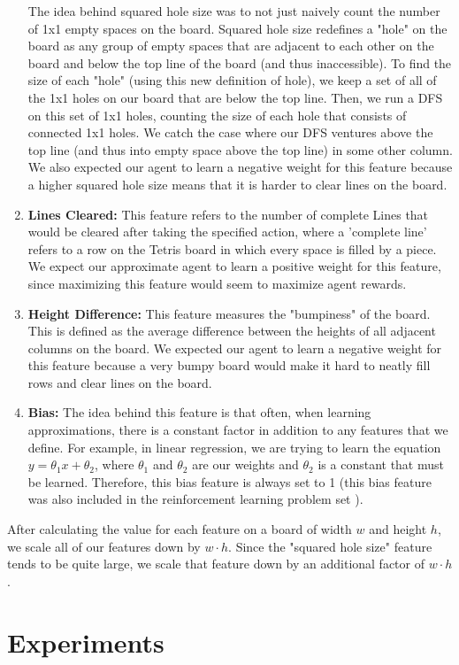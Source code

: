 \documentclass[11pt]{article}
\begin{document}
\begin{enumerate}
    The idea behind squared hole size was to not just naively count the number of 1x1 empty spaces on the board. Squared hole size redefines a "hole" on the board as any group of empty spaces that are adjacent to each other on the board and below the top line of the board (and thus inaccessible). To find the size of each "hole" (using this new definition of hole), we keep a set of all of the 1x1 holes on our board that are below the top line. Then, we run a DFS on this set of 1x1 holes, counting the size of each hole that consists of connected 1x1 holes. We catch the case where our DFS ventures above the top line (and thus into empty space above the top line) in some other column. We also expected our agent to learn a negative weight for this feature because a higher squared hole size means that it is harder to clear lines on the board.
    \item \textbf{Lines Cleared:}
    This feature refers to the number of complete Lines that would be cleared after taking the specified action, where a 'complete line' refers to a row on the Tetris board in which every space is filled by a piece. We expect our approximate agent to learn a positive weight for this feature, since maximizing this feature would seem to maximize agent rewards.
    \item \textbf{Height Difference:}
    This feature measures the "bumpiness" of the board. This is defined as the average difference between the heights of all adjacent columns on the board. We expected our agent to learn a negative weight for this feature because a very bumpy board would make it hard to neatly fill rows and clear lines on the board.
    \item \textbf{Bias:}
    The idea behind this feature is that often, when learning approximations, there is a constant factor in addition to any features that we define. For example, in linear regression, we are trying to learn the equation $y = \theta_1x + \theta_2$, where $\theta_1$ and $\theta_2$ are our weights and $\theta_2$ is a constant that must be learned. Therefore, this bias feature is always set to 1 (this bias feature was also included in the reinforcement learning problem set \cite{CODE:1}).
\end{enumerate}
After calculating the value for each feature on a board of width $w$ and height $h$, we scale all of our features down by $w\cdot h$. Since the "squared hole size" feature tends to be quite large, we scale that feature down by an additional factor of $w \cdot h$.

\section{Experiments}
\end{document}
